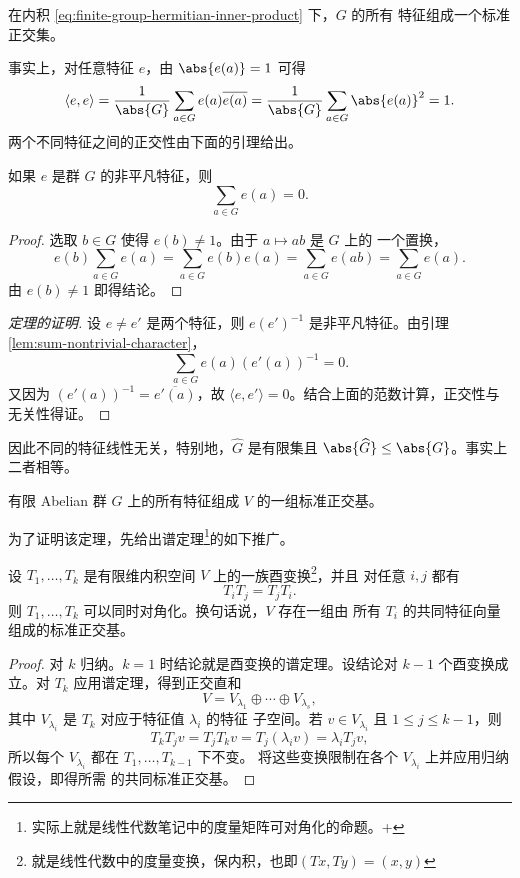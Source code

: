 \begin{theorem}\label{thm:characters-orthonormal-set}
	在内积 \eqref{eq:finite-group-hermitian-inner-product} 下，$G$ 的所有
	特征组成一个标准正交集。
\end{theorem}

事实上，对任意特征 $e$，由 $\abs{e(a)}=1$ 可得
\[
\langle e,e\rangle
=\frac1{\abs{G}}\sum_{a\in G}e(a)\overline{e(a)}
=\frac1{\abs{G}}\sum_{a\in G}\abs{e(a)}^2
=1.
\]
两个不同特征之间的正交性由下面的引理给出。

\begin{lemma}\label{lem:sum-nontrivial-character}
	如果 $e$ 是群 $G$ 的非平凡特征，则
	\[
	\sum_{a\in G}e(a)=0.
	\]
\end{lemma}

\begin{proof}
	选取 $b\in G$ 使得 $e(b)\neq1$。由于 $a\mapsto ab$ 是 $G$ 上的
	一个置换，
	\[
	e(b)\sum_{a\in G}e(a)
	=\sum_{a\in G}e(b)e(a)
	=\sum_{a\in G}e(ab)
	=\sum_{a\in G}e(a).
	\]
	由 $e(b)\neq1$ 即得结论。
\end{proof}

\begin{proof}[定理的证明]
	设 $e\neq e'$ 是两个特征，则 $e(e')^{-1}$ 是非平凡特征。由引理
	\ref{lem:sum-nontrivial-character}，
	\[
	\sum_{a\in G}e(a)(e'(a))^{-1}=0.
	\]
	又因为 $(e'(a))^{-1}=\overline{e'(a)}$，故
	$\langle e,e'\rangle=0$。结合上面的范数计算，正交性与无关性得证。
\end{proof}

因此不同的特征线性无关，特别地，$\widehat G$ 是有限集且
$\abs{\widehat G}\leq\abs{G}$。事实上二者相等。

\begin{theorem}\label{thm:characters-orthonormal-basis}
	有限 Abelian 群 $G$ 上的所有特征组成 $V$ 的一组标准正交基。
\end{theorem}

为了证明该定理，先给出谱定理\footnote{实际上就是线性代数笔记中的度量矩阵可对角化的命题。+}的如下推广。

\begin{lemma}\label{lem:simultaneous-diagonalization-unitary}
	设 $T_1,\ldots,T_k$ 是有限维内积空间 $V$ 上的一族酉变换\footnote{就是线性代数中的度量变换，保内积，也即$(Tx,Ty)=(x,y)$}，并且
	对任意 $i,j$ 都有
	\[
	T_iT_j=T_jT_i.
	\]
	则 $T_1,\ldots,T_k$ 可以同时对角化。换句话说，$V$ 存在一组由
	所有 $T_i$ 的共同特征向量组成的标准正交基。
\end{lemma}

\begin{proof}
	对 $k$ 归纳。$k=1$ 时结论就是酉变换的谱定理。设结论对
	$k-1$ 个酉变换成立。对 $T_k$ 应用谱定理，得到正交直和
	\[
	V=V_{\lambda_1}\oplus\cdots\oplus V_{\lambda_s},
	\]
	其中 $V_{\lambda_i}$ 是 $T_k$ 对应于特征值 $\lambda_i$ 的特征
	子空间。若 $v\in V_{\lambda_i}$ 且 $1\leq j\leq k-1$，则
	\[
	T_kT_jv=T_jT_kv=T_j(\lambda_i v)=\lambda_iT_jv,
	\]
	所以每个 $V_{\lambda_i}$ 都在 $T_1,\ldots,T_{k-1}$ 下不变。
	将这些变换限制在各个 $V_{\lambda_i}$ 上并应用归纳假设，即得所需
	的共同标准正交基。
\end{proof}

